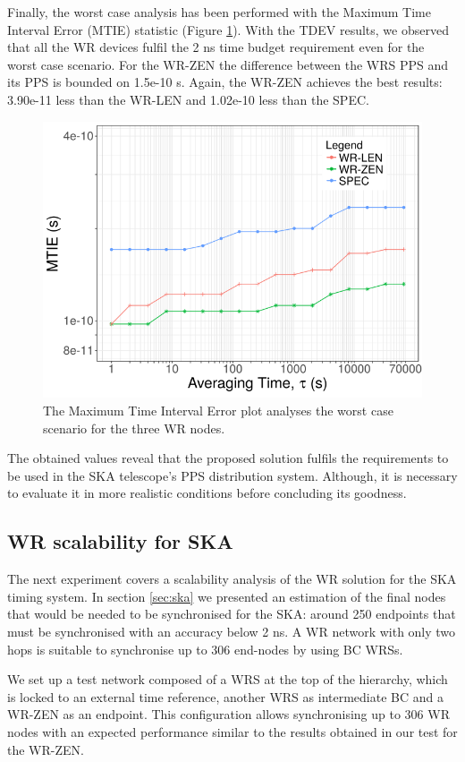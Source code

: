Finally, the worst case analysis has been performed with the Maximum Time Interval Error (MTIE) statistic (Figure \ref{fig:mtie_exp1}). With the TDEV results, we observed that all the WR devices fulfil the 2 ns time budget requirement even for the worst case scenario. 
For the WR-ZEN the difference between the WRS PPS and its PPS is bounded on 1.5e-10 s. Again, the WR-ZEN achieves the best results: 3.90e-11 less than the WR-LEN and 1.02e-10 less than the SPEC.

\begin{figure}
	\centering
	\includegraphics[width=0.7\linewidth]{img/mtie_exp1}
	\caption[MTIE for the WR devices comparison.]{The Maximum Time Interval Error plot analyses the worst case scenario for the three WR nodes.}
	\label{fig:mtie_exp1}
\end{figure}

The obtained values reveal that the proposed solution fulfils the requirements 
to be used in the SKA telescope's PPS distribution system. Although, it is 
necessary to evaluate it in more realistic conditions before concluding its 
goodness.

\subsection{WR scalability for SKA}
\label{subsec: net_exp}

The next experiment covers a scalability analysis of the WR solution for the 
SKA timing system. In section \ref{sec:ska} we presented an estimation of the final nodes that would be needed to be synchronised for the SKA: around 250 endpoints that must be synchronised with an accuracy below 2 ns. A WR network with only two hops is suitable to synchronise up to 306 end-nodes by using BC WRSs.

We set up a test network composed of a WRS at the top of the hierarchy, which is locked to an external time reference, another WRS as intermediate BC and a WR-ZEN as an endpoint. This configuration allows synchronising up to 306 WR nodes with an expected performance similar to the results obtained in our test for the WR-ZEN.

